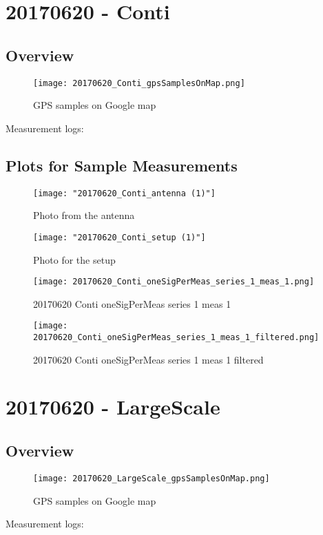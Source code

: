 \section{20170620 - Conti}
\subsection{Overview}
\begin{figure}[ht] \caption{GPS samples on Google map}
\texttt{[image: 20170620\_Conti\_gpsSamplesOnMap.png]}\centering\end{figure}
\begin{minipage}{\textwidth} Measurement logs:

 \end{minipage}
\clearpage
\subsection{Plots for Sample Measurements}
\begin{figure}[ht] \caption{Photo from the antenna}
\texttt{[image: "20170620\_Conti\_antenna (1)"]}\centering\end{figure}
\begin{figure}[ht] \caption{Photo for the setup}
\texttt{[image: "20170620\_Conti\_setup (1)"]}\centering\end{figure}
\begin{figure}[ht] \caption{20170620 Conti oneSigPerMeas series 1 meas 1}
\texttt{[image: 20170620\_Conti\_oneSigPerMeas\_series\_1\_meas\_1.png]}\centering\end{figure}
\begin{figure}[ht] \caption{20170620 Conti oneSigPerMeas series 1 meas 1 filtered}
\texttt{[image: 20170620\_Conti\_oneSigPerMeas\_series\_1\_meas\_1\_filtered.png]}\centering\end{figure}
\clearpage
\section{20170620 - LargeScale}
\subsection{Overview}
\begin{figure}[ht] \caption{GPS samples on Google map}
\texttt{[image: 20170620\_LargeScale\_gpsSamplesOnMap.png]}\centering\end{figure}
\begin{minipage}{\textwidth} Measurement logs:

 \end{minipage}
\clearpage
